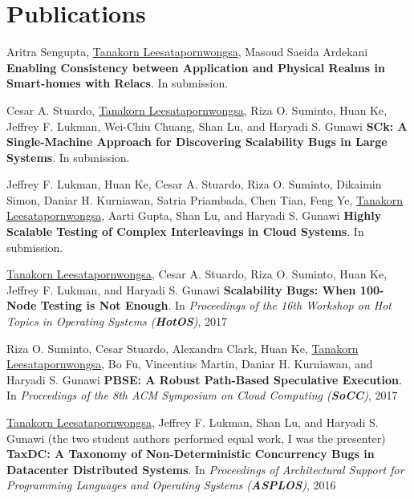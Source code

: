\documentclass[10pt]{article} %
\begin{document}

\section{Publications}

Aritra Sengupta, \underline{Tanakorn Leesatapornwongsa}, Masoud Saeida Ardekani
\textbf{Enabling Consistency between Application and Physical Realms in
Smart-homes with Relacs}. In submission.
\vspace{2mm}

Cesar A. Stuardo, \underline{Tanakorn Leesatapornwongsa}, Riza O. Suminto, Huan
Ke, Jeffrey F. Lukman, Wei-Chiu Chuang, Shan Lu, and Haryadi S. Gunawi
\textbf{SCk: A Single-Machine Approach for Discovering Scalability Bugs in
Large Systems}. In submission.
\vspace{2mm}

Jeffrey F. Lukman, Huan Ke, Cesar A. Stuardo, Riza O. Suminto, Dikaimin Simon,
Daniar H. Kurniawan, Satria Priambada, Chen Tian, Feng Ye, \underline{Tanakorn
Leesatapornwongsa}, Aarti Gupta, Shan Lu, and Haryadi S. Gunawi \textbf{Highly
Scalable Testing of Complex Interleavings in Cloud Systems}. In submission.
\vspace{2mm}

\underline{Tanakorn Leesatapornwongsa}, Cesar A. Stuardo, Riza O. Suminto, Huan Ke, 
Jeffrey F. Lukman, and Haryadi S. Gunawi \textbf{Scalability Bugs: When 100-Node
Testing is Not Enough}. In \textit{Proceedings of the 16th Workshop on Hot Topics
in Operating Systems (\textbf{HotOS})}, 2017 
\vspace{2mm}

Riza O. Suminto, Cesar Stuardo, Alexandra Clark, Huan Ke, \underline{Tanakorn
Leesatapornwongsa}, Bo Fu, Vincentius Martin, Daniar H. Kurniawan, and Haryadi
S. Gunawi \textbf{PBSE: A Robust Path-Based Speculative Execution}. In
\textit{Proceedings of the 8th ACM Symposium on Cloud Computing
(\textbf{SoCC})}, 2017
\vspace{2mm}

\underline{Tanakorn Leesatapornwongsa}, Jeffrey F. Lukman, Shan Lu, and Haryadi
S. Gunawi (the two student authors performed equal work, I was the presenter)
\textbf{TaxDC: A Taxonomy of Non-Deterministic Concurrency Bugs in Datacenter
Distributed Systems}. In \textit{Proceedings of Architectural Support for
Programming Languages and Operating Systems (\textbf{ASPLOS})}, 2016 
\vspace{2mm}
\end{document}
